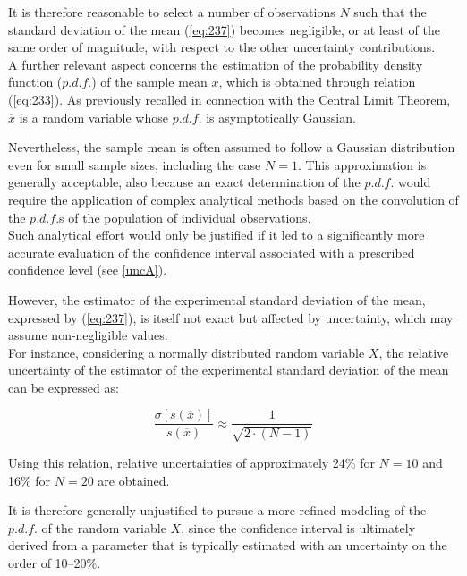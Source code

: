 \documentclass[../main.tex]{subfiles}
\begin{document}
It is therefore reasonable to select a number of observations $N$ such that the standard deviation of the mean (\autoref{eq:237}) becomes negligible, or at least of the same order of magnitude, with respect to the other uncertainty contributions.\\

A further relevant aspect concerns the estimation of the probability density function ($p.d.f.$) of the sample mean $\overline{x}$, which is obtained through relation (\autoref{eq:233}). As previously recalled in connection with the Central Limit Theorem, $\overline{x}$ is a random variable whose $p.d.f.$ is asymptotically Gaussian. 

Nevertheless, the sample mean is often assumed to follow a Gaussian distribution even for small sample sizes, including the case $N = 1$. 
This approximation is generally acceptable, also because an exact determination of the $p.d.f.$ would require the application of complex analytical methods based on the convolution of the $p.d.f.$s of the population of individual observations.\\

Such analytical effort would only be justified if it led to a significantly more accurate evaluation of the confidence interval associated with a prescribed confidence level (see \autoref{uncA}). 

However, the estimator of the experimental standard deviation of the mean, expressed by (\autoref{eq:237}), is itself not exact but affected by uncertainty, which may assume non-negligible values.\\

For instance, considering a normally distributed random variable $X$, the relative uncertainty of the estimator of the experimental standard deviation of the mean can be expressed as:

\begin{equation}
	\frac{\sigma[s(\overline{x})]}{s(\overline{x})} \approx \frac{1}{\sqrt{2 \cdot (N - 1)}}
\end{equation}

Using this relation, relative uncertainties of approximately 24\% for $N=10$ and 16\% for $N=20$ are obtained. 

It is therefore generally unjustified to pursue a more refined modeling of the $p.d.f.$ of the random variable $X$, since the confidence interval is ultimately derived from a parameter that is typically estimated with an uncertainty on the order of 10–20\%.\\
\end{document}
